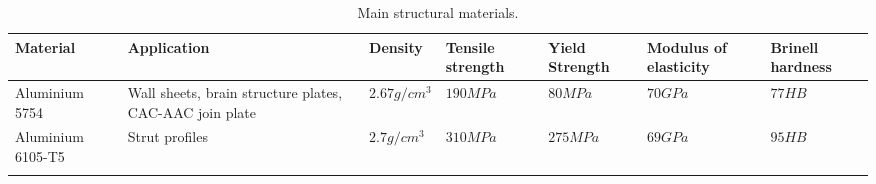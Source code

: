 


\begin{longtable}{|m{}| m{} |m{} |m{}|m{}| m{} |}
\hline
Material & Application & Density & Tensile strength & Yield Strength & Modulus of elasticity  & Brinell hardness \\ \hline 
Aluminium 5754 & Wall sheets,  brain structure plates, CAC-AAC join plate & $2.67 g/cm^3$ & $190 MPa$ & $80 MPa$ & $70 GPa$ & $77 HB$ \\ \hline
Aluminium 6105-T5 & Strut profiles & $2.7g/cm^3$ & $310 MPa$ & $275MPa$ & $69 GPa$ & $95 HB$ \\ \hline

\caption{Main structural materials.}
\label{table:materials_prop}
\end{longtable}
\raggedbottom


